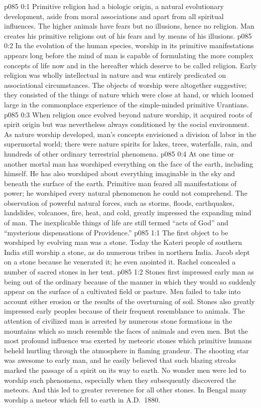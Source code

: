 \author{Brilliant Evening Star}
\vs p085 0:1 Primitive religion had a biologic origin, a natural evolutionary development, aside from moral associations and apart from all spiritual influences. The higher animals have fears but no illusions, hence no religion. Man creates his primitive religions out of his fears and by means of his illusions.
\vs p085 0:2 In the evolution of the human species, worship in its primitive manifestations appears long before the mind of man is capable of formulating the more complex concepts of life now and in the hereafter which deserve to be called religion. Early religion was wholly intellectual in nature and was entirely predicated on associational circumstances. The objects of worship were altogether suggestive; they consisted of the things of nature which were close at hand, or which loomed large in the commonplace experience of the simple\hyp{}minded primitive Urantians.
\vs p085 0:3 When religion once evolved beyond nature worship, it acquired roots of spirit origin but was nevertheless always conditioned by the social environment. As nature worship developed, man’s concepts envisioned a division of labor in the supermortal world; there were nature spirits for lakes, trees, waterfalls, rain, and hundreds of other ordinary terrestrial phenomena.
\vs p085 0:4 At one time or another mortal man has worshiped everything on the face of the earth, including himself. He has also worshiped about everything imaginable in the sky and beneath the surface of the earth. Primitive man feared all manifestations of power; he worshiped every natural phenomenon he could not comprehend. The observation of powerful natural forces, such as storms, floods, earthquakes, landslides, volcanoes, fire, heat, and cold, greatly impressed the expanding mind of man. The inexplicable things of life are still termed “acts of God” and “mysterious dispensations of Providence.”\plusone
{}
\vs p085 1:1 The first object to be worshiped by evolving man was a stone. Today the Kateri people of southern India still worship a stone, as do numerous tribes in northern India. Jacob slept on a stone because he venerated it; he even anointed it. Rachel concealed a number of sacred stones in her tent.
\vs p085 1:2 Stones first impressed early man as being out of the ordinary because of the manner in which they would so suddenly appear on the surface of a cultivated field or pasture. Men failed to take into account either erosion or the results of the overturning of soil. Stones also greatly impressed early peoples because of their frequent resemblance to animals. The attention of civilized man is arrested by numerous stone formations in the mountains which so much resemble the faces of animals and even men. But the most profound influence was exerted by meteoric stones which primitive humans beheld hurtling through the atmosphere in flaming grandeur. The shooting star was awesome to early man, and he easily believed that such blazing streaks marked the passage of a spirit on its way to earth. No wonder men were led to worship such phenomena, especially when they subsequently discovered the meteors. And this led to greater reverence for all other stones. In Bengal many worship a meteor which fell to earth in A.D.~1880.
